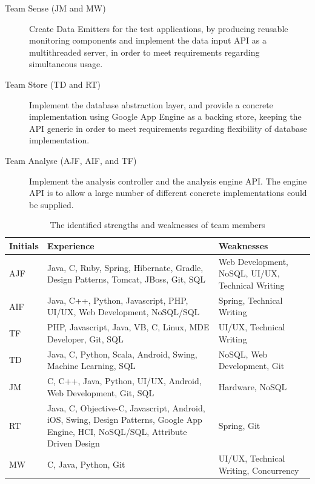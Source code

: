 \begin{description}
  \item[Team Sense (JM and MW)] Create Data Emitters for the test 
  applications, by producing reusable monitoring components and 
  implement the data input API as a multithreaded server, in order to 
  meet requirements regarding simultaneous usage.
    
  \item[Team Store (TD and RT)] Implement the database abstraction layer, and provide a concrete implementation using Google App Engine as a backing store, keeping the API generic in order to meet requirements regarding flexibility of database implementation.

  \item[Team Analyse (AJF, AIF, and TF)] Implement the analysis controller and 
  the analysis engine API. The engine API is to allow a large number of 
  different concrete implementations could be supplied. 
\end{description}

\begin{table}[H]
\centering
\begin{tabular}{|p{1.2cm}|p{8cm}|p{5cm}|}
  \hline \rowcolor{titleColor}\textbf{Initials} &
  \textbf{Experience} &
  \textbf{Weaknesses}\\

  \hline AJF
  & Java, C, Ruby, Spring, Hibernate, Gradle, Design Patterns, Tomcat, JBoss,
  Git, SQL
  & Web Development, NoSQL, UI/UX, Technical Writing \\

  \hline AIF
  & Java, C++, Python, Javascript, PHP, UI/UX, Web Development, NoSQL/SQL
  & Spring, Technical Writing \\
  
  \hline TF
  & PHP, Javascript, Java, VB, C, Linux, MDE Developer, Git, SQL
  & UI/UX, Technical Writing \\

  \hline TD
  & Java, C, Python, Scala, Android, Swing, Machine Learning, SQL
  & NoSQL, Web Development, Git \\

  \hline JM
  & C, C++, Java, Python, UI/UX, Android, Web Development, Git, SQL
  & Hardware, NoSQL \\

  \hline RT
  & Java, C, Objective-C, Javascript, Android, iOS, Swing, Design Patterns,
  Google App Engine, HCI, NoSQL/SQL, Attribute Driven Design
  & Spring, Git \\

  \hline MW
  & C, Java, Python, Git
  & UI/UX, Technical Writing, Concurrency \\
  \hline
\end{tabular}
\caption{The identified strengths and weaknesses of team members}
\label{tab:skills}
\end{table}

